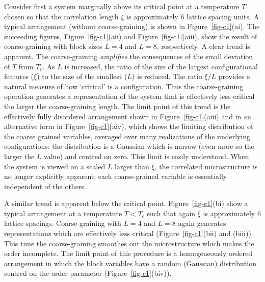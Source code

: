 \documentclass[
  letterpaper,
  enabledeprecatedfontcommands]{report}
\begin{document}
Consider first a system marginally above its critical point at a
temperature \(T\) chosen so that the correlation length \(\xi\) is
approximately 6 lattice spacing units. A typical arrangement (without
coarse-graining) is shown in Figure~\ref{fig-c1}(ai). The succeeding
figures, Figure~\ref{fig-c1}(aii) and Figure~\ref{fig-c1}(aiii), show
the result of coarse-graining with block sizes \(L=4\) and \(L=8\),
respectively. A clear trend is apparent. The coarse-graining
\emph{amplifies} the consequences of the small deviation of \(T\) from
\(T_c\). As \(L\) is increased, the ratio of the size of the largest
configurational features (\(\xi\)) to the size of the smallest (\(L\))
is reduced. The ratio \(\xi/L\) provides a natural measure of how
`critical' is a configuration. Thus the coarse-graining operation
generates a representation of the system that is effectively less
critical the larger the coarse-graining length. The limit point of this
trend is the effectively fully disordered arrangement shown in
Figure~\ref{fig-c1}(aiii) and in an alternative form in
Figure~\ref{fig-c1}(aiv), which shows the limiting distribution of the
coarse grained variables, averaged over many realizations of the
underlying configurations: the distribution is a Gaussian which is
narrow (even more so the larger the \(L\) value) and centred on zero.
This limit is easily understood. When the system is viewed on a scaled
\(L\) larger than \(\xi\), the correlated microstructure is no longer
explicitly apparent; each coarse-grained variable is essentially
independent of the others.

A similar trend is apparent below the critical point.
Figure~\ref{fig-c1}(bi) show a typical arrangement at a temperature
\(T<T_c\) such that again \(\xi\) is approximately \(6\) lattice
spacings. Coarse-graining with \(L=4\) and \(L=8\) again generates
representations which are effectively less critical
(Figure~\ref{fig-c1}(bii) and (biii)). This time the coarse-graining
smoothes out the microstructure which makes the order incomplete. The
limit point of this procedure is a homogeneously ordered arrangement in
which the block variables have a random (Gaussian) distribution centred
on the order parameter (Figure~\ref{fig-c1}(biv)).
\end{document}
